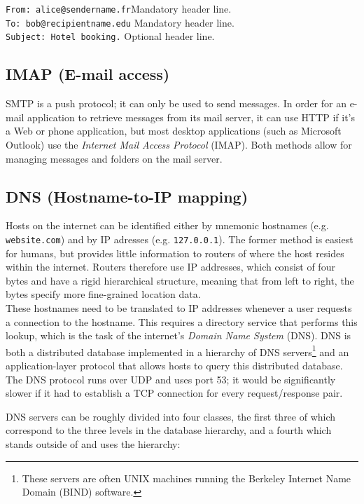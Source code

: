 \documentclass[8pt, table, xcdraw]{article}%
\begin{document}
\texttt{From: alice@sendername.fr}Mandatory header line.\\
\texttt{To: bob@recipientname.edu} Mandatory header line.\\
\texttt{Subject: Hotel booking.} Optional header line.

\subsection{IMAP (E-mail access)}

SMTP is a push protocol; it can only be used to send messages. In order for an e-mail application to retrieve messages from its mail server, it can use HTTP if it's a Web or phone application, but most desktop applications (such as Microsoft Outlook) use the \emph{Internet Mail Access Protocol} (IMAP). Both methods allow for managing messages and folders on the mail server.

\subsection{DNS (Hostname-to-IP mapping)} \label{DNS}

Hosts on the internet can be identified either by mnemonic hostnames (e.g. \texttt{website.com}) and by IP adresses (e.g. \texttt{127.0.0.1}). The former method is easiest for humans, but provides little information to routers of where the host resides within the internet. Routers therefore use IP addresses, which consist of four bytes and have a rigid hierarchical structure, meaning that from left to right, the bytes specify more fine-grained location data.\\
These hostnames need to be translated to IP addresses whenever a user requests a connection to the hostname. This requires a directory service that performs this lookup, which is the task of the internet's \emph{Domain Name System} (DNS). DNS is both a distributed database implemented in a hierarchy of DNS servers\footnote{These servers are often UNIX machines running the Berkeley Internet Name Domain (BIND) software.} and an application-layer protocol that allows hosts to query this distributed database. The DNS protocol runs over UDP and uses port 53; it would be significantly slower if it had to establish a TCP connection for every request/response pair.

DNS servers can be roughly divided into four classes, the first three of which correspond to the three levels in the database hierarchy, and a fourth which stands outside of and uses the hierarchy:
\end{document}
